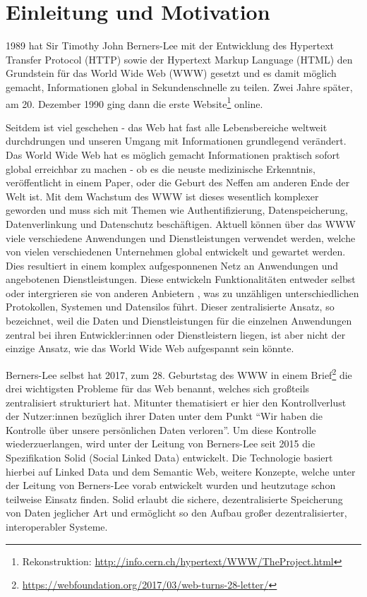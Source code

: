 \documentclass[acmtog]{acmart}
\begin{document}
\section{Einleitung und Motivation} \label{section:einleitungUndMotivation}

1989 hat Sir Timothy John Berners-Lee mit der Entwicklung des Hypertext Transfer Protocol (HTTP) sowie der Hypertext Markup Language (HTML) den Grundstein für das World Wide Web (WWW) gesetzt und es damit möglich gemacht, Informationen global in Sekundenschnelle zu teilen.\cite{birth-web} Zwei Jahre später, am 20. Dezember 1990 ging dann die erste Website\footnote{Rekonstruktion: \url{http://info.cern.ch/hypertext/WWW/TheProject.html}} online.

Seitdem ist viel geschehen - das Web hat fast alle Lebensbereiche weltweit durchdrungen und unseren Umgang mit Informationen grundlegend verändert. Das World Wide Web hat es möglich gemacht Informationen praktisch sofort global erreichbar zu machen - ob es die neuste medizinische Erkenntnis, veröffentlicht in einem Paper, oder die Geburt des Neffen am anderen Ende der Welt ist. Mit dem Wachstum des WWW ist dieses wesentlich komplexer geworden und muss sich mit Themen wie Authentifizierung, Datenspeicherung, Datenverlinkung und Datenschutz beschäftigen. Aktuell können über das WWW viele verschiedene Anwendungen und Dienstleistungen verwendet werden, welche von vielen verschiedenen Unternehmen global entwickelt und gewartet werden. Dies resultiert in einem komplex aufgesponnenen Netz an Anwendungen und angebotenen Dienstleistungen. Diese entwickeln Funktionalitäten entweder selbst oder intergrieren sie von anderen Anbietern , was zu unzähligen unterschiedlichen Protokollen, Systemen und Datensilos führt. Dieser zentralisierte Ansatz, so bezeichnet, weil die Daten und Dienstleistungen für die einzelnen Anwendungen zentral bei ihren Entwickler:innen oder Dienstleistern liegen, ist aber nicht der einzige Ansatz, wie das World Wide Web aufgespannt sein könnte. 

Berners-Lee selbst hat 2017, zum 28. Geburtstag  des WWW in einem Brief\footnote{\url{https://webfoundation.org/2017/03/web-turns-28-letter/}} die drei wichtigsten Probleme für das Web benannt, welches sich großteils zentralisiert strukturiert hat. Mitunter thematisiert er hier den Kontrollverlust der Nutzer:innen bezüglich ihrer Daten unter dem Punkt "`Wir haben die Kontrolle über unsere persönlichen Daten verloren"'. Um diese Kontrolle wiederzuerlangen, wird unter der Leitung von Berners-Lee seit 2015 die Spezifikation Solid (Social Linked Data) entwickelt. Die Technologie basiert hierbei auf Linked Data und dem Semantic Web, weitere Konzepte, welche unter der Leitung von Berners-Lee vorab entwickelt wurden und heutzutage schon teilweise Einsatz finden. Solid erlaubt die sichere, dezentralisierte Speicherung von Daten jeglicher Art und ermöglicht so den Aufbau großer dezentralisierter, interoperabler Systeme.
\end{document}
